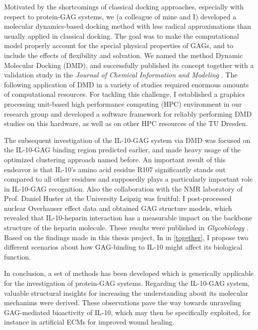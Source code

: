 Motivated by the shortcomings of classical docking approaches, especially with
respect to protein-GAG systems, we (a colleague of mine and I) developed a
molecular dynamics-based docking method with less radical approximations than
usually applied in classical docking. The goal was to make the computational
model properly account for the special physical properties of GAGs, and to
include the effects of flexibility and solvation. We named the method Dynamic
Molecular Docking (DMD), and successfully published its concept together with a
validation study in the \textit{Journal of Chemical Information and
Modeling} \cite{dmd_samsonov_gehrcke_2014}. The following application of DMD in a
variety of studies required enormous amounts of computational resources. For
tackling this challenge, I established a graphics processing unit-based high
performance computing (HPC) environment in our research group and developed a
software framework for reliably performing DMD studies on this hardware, as well
as on other HPC resources of the TU Dresden.

The subsequent investigation of the IL-10-GAG system via DMD was focused on the
IL-10-GAG binding region predicted earlier, and made heavy usage of the
optimized clustering approach named before. An important result of this endeavor
is that IL-10's amino acid residue R107 significantly stands out compared to all
other residues and supposedly plays a particularly important role in IL-10-GAG
recognition. Also the collaboration with the NMR laboratory of Prof. Daniel
Huster at the University Leipzig was fruitful: I post-processed nuclear
Overhauser effect data and obtained GAG structure models, which revealed that
IL-10-heparin interaction has a measurable impact on the backbone structure of
the heparin molecule. These results were published in \textit{Glycobiology}
\cite{kuenze_gehrcke_2014}. Based on the findings made in this thesis project,
In in \cref{together}, I propose two different scenarios about how GAG-binding
to IL-10 might affect its biological function.

In conclusion, a set of methods has been developed which is generically
applicable for the investigation of protein-GAG systems. Regarding the IL-10-GAG
system, valuable structural insights for increasing the understanding about its
molecular mechanims were derived. These observations pave the way towards
unraveling GAG-mediated bioactivity of IL-10, which may then be specifically
exploited, for instance in artificial ECMs for improved wound healing.
